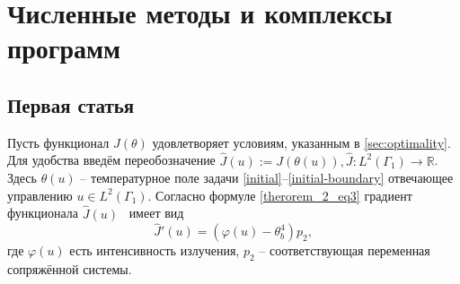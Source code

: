 \chapter{Численные методы и комплексы программ}\label{ch:ch3}


\section{Первая статья}\label{sec:ch3/sect1}
Пусть функционал $J(\theta)$ удовлетворяет условиям, указанным в \autoref{sec:optimality}.
Для удобства введём переобозначение $\hat{J}(u):=J(\theta(u)), \hat{J}:L^2(\Gamma_1) \to \mathbb{R}$.
Здесь $\theta(u)$ -- температурное поле задачи  \eqref{initial}--\eqref{initial-boundary} отвечающее
управлению $u \in L^2(\Gamma_1)$.
Согласно формуле \eqref{therorem_2_eq3} градиент функционала $\hat{J}(u)$~\cite{grenkin_13} имеет вид
\[
    \hat{J}'(u)= (\varphi(u) -\theta_b^4)p_2,
\]
где $\varphi(u)$ есть интенсивность излучения, $p_2$ -- соответствующая переменная сопряжённой системы.

